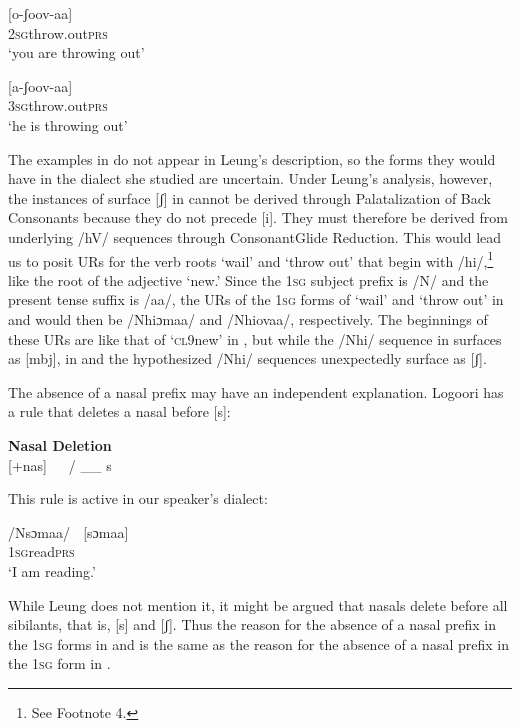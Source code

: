 \documentclass[output=paper]{langsci/langscibook}
\begin{document}
\ea{}
 [o-ʃoov-aa]  \\
\textsc{2sg}throw.out\textsc{prs} \\
\glt ‘you are throwing out’
\z


\ea{}
 [a-ʃoov-aa]  \\
\textsc{3sg}throw.out\textsc{prs} \\
\glt ‘he is throwing out’
\z

The examples in  do not appear in Leung’s description, so the forms they would have in the dialect she studied are uncertain. Under Leung’s analysis, however, the instances of surface [ʃ] in  cannot be derived through Palatalization of Back Consonants because they do not precede [i]. They must therefore be derived from underlying /hV/ sequences through ConsonantGlide Reduction. This would lead us to posit URs for the verb roots ‘wail’ and ‘throw out’ that begin with /hi/,\footnote{See Footnote 4.} like the root of the adjective ‘new.’ Since the 1\textsc{sg} subject prefix is /N/ and the present tense suffix is /aa/, the URs of the 1\textsc{sg} forms of ‘wail’ and ‘throw out’ in  and  would then be /Nhiɔmaa/ and /Nhiovaa/, respectively. The beginnings of these URs are like that of ‘\textsc{cl}9new’ in , but while the /Nhi/ sequence in  surfaces as [mbj], in  and  the hypothesized /Nhi/ sequences unexpectedly surface as [ʃ]. 

The absence of a nasal prefix may have an independent explanation. Logoori has a rule that deletes a nasal before [s]:



\ea{}
 \textbf{Nasal Deletion} \citep[116]{Leung1991}\\{}
 [+nas]   / \_\_ s\\
\z



This rule is active in our speaker’s dialect:


\ea{}
 /Nsɔmaa/    [sɔmaa]\\
\textsc{1sg}read\textsc{prs}\\
\glt ‘I am reading.’
\z

While Leung does not mention it, it might be argued that nasals delete before all sibilants, that is, [s] and [ʃ]. Thus the reason for the absence of a nasal prefix in the 1\textsc{sg} forms in  and  is the same as the reason for the absence of a nasal prefix in the 1\textsc{sg} form in . 
\end{document}
